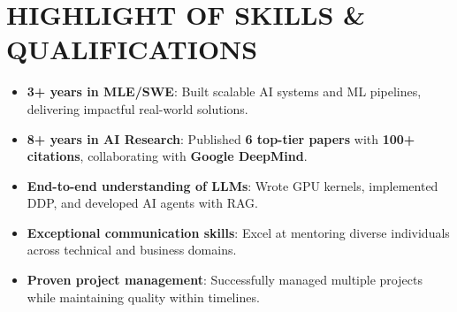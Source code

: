 \section{HIGHLIGHT OF SKILLS \& QUALIFICATIONS}
\begin{itemize}
    \item \textbf{3+ years in MLE/SWE}: Built scalable AI systems and ML pipelines, delivering impactful real-world solutions.
    \item \textbf{8+ years in AI Research}: Published \textbf{6 top-tier papers} with \textbf{100+ citations}, collaborating with \textbf{Google DeepMind}.
    \item \textbf{End-to-end understanding of LLMs}: Wrote GPU kernels, implemented DDP, and developed AI agents with RAG.
    \item \textbf{Exceptional communication skills}: Excel at mentoring diverse individuals across technical and business domains.
    \item \textbf{Proven project management}: Successfully managed multiple projects while maintaining quality within timelines.
\end{itemize}